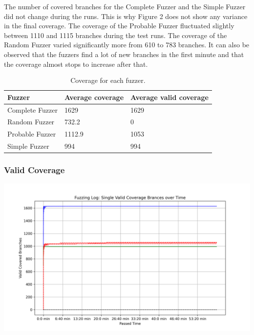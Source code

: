 \documentclass[runningheads]{llncs}
\begin{document}
The number of covered branches for the Complete Fuzzer and the Simple Fuzzer did not change during the runs. This is why Figure 2 does not show any variance in the final coverage. The coverage of the Probable Fuzzer fluctuated slightly between 1110 and 1115 branches during the test runs. The coverage of the Random Fuzzer varied significantly more from 610 to 783 branches.
It can also be observed that the fuzzers find a lot of new branches in the first minute and that the coverage almost stops to increase after that.

\bgroup
\def\arraystretch{1.5}
\setlength\tabcolsep{1.5ex}
\begin{table}[]
    \caption{Coverage for each fuzzer.}
    \label{tab3}
    \begin{center}
        \begin{tabular}{|l|l|l|}
            \hline
            \textbf{Fuzzer} & \textbf{Average coverage} & \textbf{Average valid coverage} \\ \hline \hline
            Complete Fuzzer & 1629                      & 1629                            \\ \hline
            Random Fuzzer   & 732.2                     & 0                               \\ \hline
            Probable Fuzzer & 1112.9                    & 1053                            \\ \hline
            Simple Fuzzer   & 994                       & 994                             \\ \hline
        
        \end{tabular}
    \end{center}
\end{table}
\egroup

\subsubsection{Valid Coverage}
\begin{center}
\includegraphics[width=\textwidth]{img/valid_coverage}
\label{fig3}
\end{center}
\end{document}
